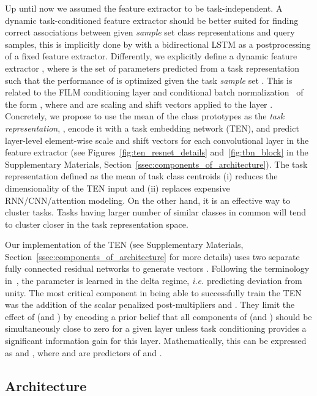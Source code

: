 \documentclass{article}
\begin{document}
Up until now we assumed the feature extractor  to be task-independent. A dynamic task-conditioned feature extractor should be better suited for finding correct associations between given \emph{sample} set class representations and query samples, this is implicitly done by \citet{vinyals2016matching} with a bidirectional LSTM as a postprocessing of a fixed feature extractor. Differently, we explicitly define a dynamic feature extractor , where  is the set of parameters predicted from a task representation such that the performance of  is optimized given the task \emph{sample} set . This is related to the FILM conditioning layer \citep{perez2017film} and conditional batch normalization~\citep{Dumoulin2017learned,Perez2017LearningVR} of the form , where  and  are scaling and shift vectors applied to the layer . Concretely, we propose to use the mean of the class prototypes as the \emph{task representation}, , encode it with a task embedding network (TEN), and predict layer-level element-wise scale and shift vectors  for each convolutional layer in the feature extractor (see Figures~\ref{fig:ten_resnet_details} and~\ref{fig:tbn_block} in the Supplementary Materials, Section~\ref{ssec:components_of_architecture}). The task representation defined as the mean of task class centroids (i) reduces the dimensionality of the TEN input and (ii) replaces expensive RNN/CNN/attention modeling. On the other hand, it is an effective way to cluster tasks. Tasks having larger number of similar classes in common will tend to cluster closer in the task representation space.
 
Our implementation of the TEN (see Supplementary Materials, Section~\ref{ssec:components_of_architecture} for more details) uses two separate fully connected residual networks to generate vectors . Following the terminology in~\citep{Perez2017LearningVR}, the  parameter is learned in the delta regime, \emph{i.e.} predicting deviation from unity. The most critical component in being able to successfully train the TEN was the addition of the scalar  penalized post-multipliers  and . They limit the effect of  (and ) by encoding a prior belief that all components of   (and ) should be simultaneously close to zero for a given layer unless task conditioning provides a significant information gain for this layer. Mathematically, this can be expressed as  and , where  and  are predictors of  and .

\subsection{Architecture} \label{ssec:theory_architecture}
\end{document}

